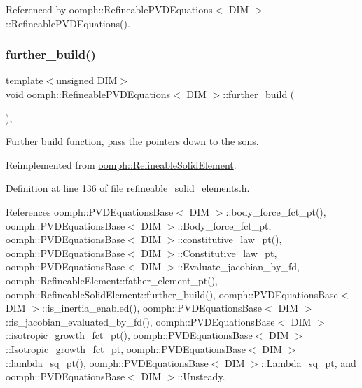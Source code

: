 Referenced by oomph\+::\+Refineable\+P\+V\+D\+Equations$<$ D\+I\+M $>$\+::\+Refineable\+P\+V\+D\+Equations().

\mbox{\label{classoomph_1_1RefineablePVDEquations_a936bab952ddbad5093cb7ee80d0019b5}} 
\subsubsection{\texorpdfstring{further\+\_\+build()}{further\_build()}}
{\footnotesize\ttfamily template$<$unsigned D\+IM$>$ \\
void \hyperlink{classoomph_1_1RefineablePVDEquations}{oomph\+::\+Refineable\+P\+V\+D\+Equations}$<$ D\+IM $>$\+::further\+\_\+build (\begin{DoxyParamCaption}{ }\end{DoxyParamCaption})\hspace{0.3cm}{\ttfamily [inline]}, {\ttfamily [virtual]}}



Further build function, pass the pointers down to the sons. 



Reimplemented from \hyperlink{classoomph_1_1RefineableSolidElement_a159967ccbb5327b2ee04154a11b1b51c}{oomph\+::\+Refineable\+Solid\+Element}.



Definition at line 136 of file refineable\+\_\+solid\+\_\+elements.\+h.



References oomph\+::\+P\+V\+D\+Equations\+Base$<$ D\+I\+M $>$\+::body\+\_\+force\+\_\+fct\+\_\+pt(), oomph\+::\+P\+V\+D\+Equations\+Base$<$ D\+I\+M $>$\+::\+Body\+\_\+force\+\_\+fct\+\_\+pt, oomph\+::\+P\+V\+D\+Equations\+Base$<$ D\+I\+M $>$\+::constitutive\+\_\+law\+\_\+pt(), oomph\+::\+P\+V\+D\+Equations\+Base$<$ D\+I\+M $>$\+::\+Constitutive\+\_\+law\+\_\+pt, oomph\+::\+P\+V\+D\+Equations\+Base$<$ D\+I\+M $>$\+::\+Evaluate\+\_\+jacobian\+\_\+by\+\_\+fd, oomph\+::\+Refineable\+Element\+::father\+\_\+element\+\_\+pt(), oomph\+::\+Refineable\+Solid\+Element\+::further\+\_\+build(), oomph\+::\+P\+V\+D\+Equations\+Base$<$ D\+I\+M $>$\+::is\+\_\+inertia\+\_\+enabled(), oomph\+::\+P\+V\+D\+Equations\+Base$<$ D\+I\+M $>$\+::is\+\_\+jacobian\+\_\+evaluated\+\_\+by\+\_\+fd(), oomph\+::\+P\+V\+D\+Equations\+Base$<$ D\+I\+M $>$\+::isotropic\+\_\+growth\+\_\+fct\+\_\+pt(), oomph\+::\+P\+V\+D\+Equations\+Base$<$ D\+I\+M $>$\+::\+Isotropic\+\_\+growth\+\_\+fct\+\_\+pt, oomph\+::\+P\+V\+D\+Equations\+Base$<$ D\+I\+M $>$\+::lambda\+\_\+sq\+\_\+pt(), oomph\+::\+P\+V\+D\+Equations\+Base$<$ D\+I\+M $>$\+::\+Lambda\+\_\+sq\+\_\+pt, and oomph\+::\+P\+V\+D\+Equations\+Base$<$ D\+I\+M $>$\+::\+Unsteady.



